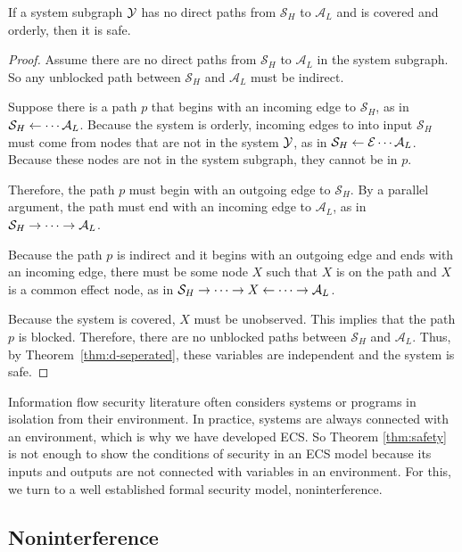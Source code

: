 \documentclass[../thesis.tex]{subfiles}
\begin{document}
\begin{thm}
  \label{thm:safety}
  If a system subgraph $\mathcal{Y}$ has no direct paths from
  $\mathcal{S}_H$ to $\mathcal{A}_L$ and is covered
  and orderly, then it is safe.
\end{thm}
\begin{proof}
  Assume there are no direct paths from $\mathcal{S}_H$ to
  $\mathcal{A}_L$ in the system subgraph.
  So any unblocked path between $\mathcal{S}_H$ and
  $\mathcal{A}_L$ must be indirect.
  
  Suppose there is a path $p$ that begins
  with an incoming edge to $\mathcal{S}_H$,
  as in $\mathcal{S}_H \leftarrow \cdots \mathcal{A}_L$.
  Because the system is orderly, incoming edges
  to into input $\mathcal{S}_H$ must come
  from nodes that are not in the system $\mathcal{Y}$,
  as in $\mathcal{S}_H \leftarrow \mathcal{E} \cdots \mathcal{A}_L$.
  Because these
  nodes are not in the system subgraph, they cannot be
  in $p$.
  
  Therefore, the path $p$ must begin with an outgoing edge to
  $\mathcal{S}_H$. By a parallel argument, the path
  must end with an incoming edge to $\mathcal{A}_L$,
  as in $\mathcal{S}_H \rightarrow \cdots \rightarrow \mathcal{A}_L$.

  Because the path $p$ is indirect and it begins with an outgoing
  edge and ends with an incoming edge, there must be some
  node $X$ such that $X$ is on the path and $X$ is a common
  effect node, 
  as in 
  $\mathcal{S}_H \rightarrow \cdots \rightarrow X \leftarrow \cdots \rightarrow \mathcal{A}_L$.
  
  Because the system is covered, $X$ must be unobserved.
  This implies that the path $p$ is blocked.
  Therefore, there are no unblocked paths between
  $\mathcal{S}_H$ and $\mathcal{A}_L$.
  Thus, by Theorem~\ref{thm:d-seperated}, these
  variables are independent and the system is safe.
\end{proof}

Information flow security literature often considers
systems or programs in isolation from their environment.
In practice, systems are always connected with an environment,
which is why we have developed ECS.
So Theorem \ref{thm:safety} is not enough to show the conditions of
security in an ECS model because its inputs and outputs
are not connected with variables in an environment.
For this, we turn to a well established formal security model,
noninterference.


\subsection{Noninterference}
\label{sec:noninterference}
\end{document}
